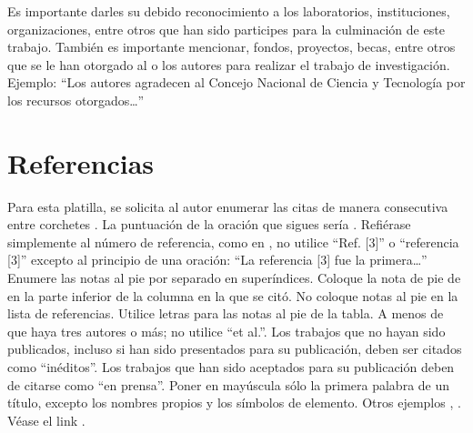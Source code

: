     Es importante darles su debido reconocimiento a los laboratorios, instituciones, organizaciones, entre otros que han sido participes para la culminación de este trabajo. También es importante mencionar, fondos, proyectos, becas, entre otros que se le han otorgado al o los autores para realizar el trabajo de investigación. Ejemplo: “Los autores agradecen al Concejo Nacional de Ciencia y Tecnología por los recursos otorgados…”
    
    \section*{Referencias}
    
    Para esta platilla, se solicita al autor enumerar las citas de manera consecutiva entre corchetes \cite{YLi2013}. 
    La puntuación de la oración que sigues sería \cite{Mesaelides2011}. 
    Refiérase simplemente al número de referencia, como en \cite{Morales2012}, no utilice “Ref. [3]” o “referencia [3]” excepto al principio de una oración: “La referencia [3] fue la primera…”
    Enumere las notas al pie por separado en superíndices. Coloque la nota de pie de en la parte inferior de la columna en la que se citó. No coloque notas al pie en la lista de referencias. Utilice letras para las notas al pie de la tabla.
    A menos de que haya tres autores o más; no utilice “et al.”. Los trabajos que no hayan sido publicados, incluso si han sido presentados para su publicación, deben ser citados como “inéditos”. Los trabajos que han sido aceptados para su publicación deben de citarse como “en prensa”. Poner en mayúscula sólo la primera palabra de un título, excepto los nombres propios y los símbolos de elemento. 
    Otros ejemplos \cite{LAAngeles2021}, \cite{LAAngelesConni}. 
    Véase el link \cite{prueba}.
    
    
    
